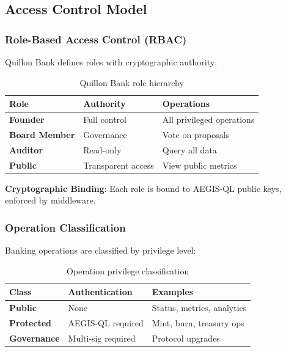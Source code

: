\documentclass[11pt,a4paper]{article}
\begin{document}
\subsection{Access Control Model}

\subsubsection{Role-Based Access Control (RBAC)}

Quillon Bank defines roles with cryptographic authority:

\begin{table}[h]
\centering
\small
\begin{tabular}{@{}lll@{}}
\toprule
\textbf{Role} & \textbf{Authority} & \textbf{Operations} \\ \midrule
\textbf{Founder} & Full control & All privileged operations \\
\textbf{Board Member} & Governance & Vote on proposals \\
\textbf{Auditor} & Read-only & Query all data \\
\textbf{Public} & Transparent access & View public metrics \\ \bottomrule
\end{tabular}
\caption{Quillon Bank role hierarchy}
\label{tab:roles}
\end{table}

\textbf{Cryptographic Binding}: Each role is bound to AEGIS-QL public keys, enforced by middleware.

\subsubsection{Operation Classification}

Banking operations are classified by privilege level:

\begin{table}[h]
\centering
\small
\begin{tabular}{@{}lll@{}}
\toprule
\textbf{Class} & \textbf{Authentication} & \textbf{Examples} \\ \midrule
\textbf{Public} & None & Status, metrics, analytics \\
\textbf{Protected} & AEGIS-QL required & Mint, burn, treasury ops \\
\textbf{Governance} & Multi-sig required & Protocol upgrades \\ \bottomrule
\end{tabular}
\caption{Operation privilege classification}
\label{tab:ops}
\end{table}
\end{document}
